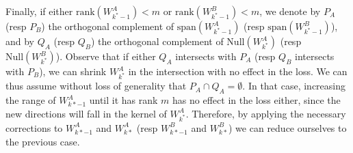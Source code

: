 
Finally, if either $\text{rank}(W_{k^*-1}^A) < m$ or $\text{rank}(W_{k^*-1}^B) < m$, 
we denote by $P_A$ (resp $P_B$) the orthogonal complement of $\text{span}(W_{k^*-1}^A)$ 
(resp  $\text{span}(W_{k^*-1}^B)$), and by $Q_A$ (resp $Q_B$) the orthogonal complement of 
$\text{Null}(W_{k^*}^A)$ 
(resp  $\text{Null}(W_{k^*}^B)$).
 Observe that if either $Q_A$ intersects with $P_A$ (resp  $Q_B$ intersects with $P_B$), 
 we can shrink $W_{k^*}^A$ in the intersection with no effect in the loss. 
 We can thus assume without loss of generality that $P_A \cap Q_A = \emptyset$. 
 In that case, increasing the range of $W_{k*-1}^A$ until it has rank $m$ has no effect 
 in the loss either, since the new directions will fall in the kernel of $W_{k^*}^A$. 
Therefore, by applying the necessary corrections to $W_{k*-1}^A$ and $W_{k*}^A$
 (resp $W_{k*-1}^B$ and $W_{k*}^B$) we can reduce ourselves to the previous case. 


%
%
%

%


